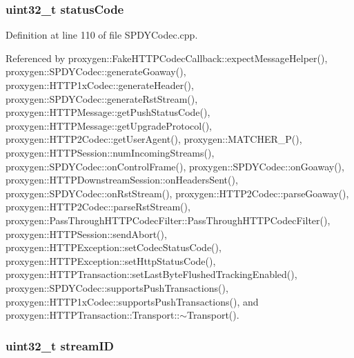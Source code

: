 \subsubsection[{status\+Code}]{\setlength{\rightskip}{0pt plus 5cm}uint32\+\_\+t status\+Code}\label{SPDYCodec_8cpp_a6d7c29827e855a62945ede0ae6e82786}


Definition at line 110 of file S\+P\+D\+Y\+Codec.\+cpp.



Referenced by proxygen\+::\+Fake\+H\+T\+T\+P\+Codec\+Callback\+::expect\+Message\+Helper(), proxygen\+::\+S\+P\+D\+Y\+Codec\+::generate\+Goaway(), proxygen\+::\+H\+T\+T\+P1x\+Codec\+::generate\+Header(), proxygen\+::\+S\+P\+D\+Y\+Codec\+::generate\+Rst\+Stream(), proxygen\+::\+H\+T\+T\+P\+Message\+::get\+Push\+Status\+Code(), proxygen\+::\+H\+T\+T\+P\+Message\+::get\+Upgrade\+Protocol(), proxygen\+::\+H\+T\+T\+P2\+Codec\+::get\+User\+Agent(), proxygen\+::\+M\+A\+T\+C\+H\+E\+R\+\_\+\+P(), proxygen\+::\+H\+T\+T\+P\+Session\+::num\+Incoming\+Streams(), proxygen\+::\+S\+P\+D\+Y\+Codec\+::on\+Control\+Frame(), proxygen\+::\+S\+P\+D\+Y\+Codec\+::on\+Goaway(), proxygen\+::\+H\+T\+T\+P\+Downstream\+Session\+::on\+Headers\+Sent(), proxygen\+::\+S\+P\+D\+Y\+Codec\+::on\+Rst\+Stream(), proxygen\+::\+H\+T\+T\+P2\+Codec\+::parse\+Goaway(), proxygen\+::\+H\+T\+T\+P2\+Codec\+::parse\+Rst\+Stream(), proxygen\+::\+Pass\+Through\+H\+T\+T\+P\+Codec\+Filter\+::\+Pass\+Through\+H\+T\+T\+P\+Codec\+Filter(), proxygen\+::\+H\+T\+T\+P\+Session\+::send\+Abort(), proxygen\+::\+H\+T\+T\+P\+Exception\+::set\+Codec\+Status\+Code(), proxygen\+::\+H\+T\+T\+P\+Exception\+::set\+Http\+Status\+Code(), proxygen\+::\+H\+T\+T\+P\+Transaction\+::set\+Last\+Byte\+Flushed\+Tracking\+Enabled(), proxygen\+::\+S\+P\+D\+Y\+Codec\+::supports\+Push\+Transactions(), proxygen\+::\+H\+T\+T\+P1x\+Codec\+::supports\+Push\+Transactions(), and proxygen\+::\+H\+T\+T\+P\+Transaction\+::\+Transport\+::$\sim$\+Transport().

\subsubsection[{stream\+ID}]{\setlength{\rightskip}{0pt plus 5cm}uint32\+\_\+t stream\+ID}\label{SPDYCodec_8cpp_afa72d8fe10c82e854f975c64b49585de}


